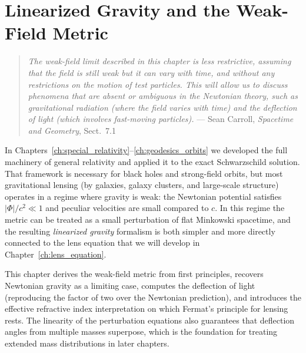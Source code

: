 
\chapter{Linearized Gravity and the Weak-Field Metric}
\label{ch:linearized_gravity}

\begin{quote}
\textit{The weak-field limit described in this chapter is less restrictive, assuming
that the field is still weak but it can vary with time, and without any
restrictions on the motion of test particles.  This will allow us to discuss
phenomena that are absent or ambiguous in the Newtonian theory, such as
gravitational radiation (where the field varies with time) and the deflection
of light (which involves fast-moving particles).}
\hfill --- Sean Carroll, \textit{Spacetime and Geometry}, Sect.~7.1
\end{quote}

\noindent
In Chapters~\ref{ch:special_relativity}--\ref{ch:geodesics_orbits} we developed the full machinery of general relativity
and applied it to the exact Schwarzschild solution.  That framework is
necessary for black holes and strong-field orbits, but
most gravitational lensing (by galaxies, galaxy clusters,
and large-scale structure) operates in a regime where gravity is
weak: the Newtonian potential satisfies $|\Phi|/c^2 \ll 1$ and peculiar
velocities are small compared to $c$.  In this regime the metric can be
treated as a small perturbation of flat Minkowski spacetime, and the
resulting \emph{linearized gravity} formalism is both simpler and
more directly connected to the lens equation that we will develop in
Chapter~\ref{ch:lens_equation}.

This chapter derives the weak-field metric from first principles, recovers
Newtonian gravity as a limiting case, computes the deflection of light
(reproducing the factor of two over the Newtonian prediction),
and introduces the effective refractive index interpretation on which
Fermat's principle for lensing rests.
The linearity of the perturbation equations also guarantees that
deflection angles from multiple masses superpose, which is the
foundation for treating extended mass distributions in later chapters.


